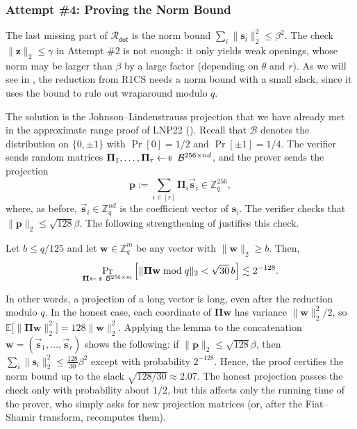 \documentclass[../../book.tex]{subfiles}
\begin{document}
\subsubsection{Attempt \#4: Proving the Norm Bound}

The last missing part of $\mathcal{R}_{\mathsf{dot}}$ is the norm bound $\sum_i \|\mathbf{s}_i\|_2^2 \leq \beta^2$.
The check $\|\mathbf{z}\|_2 \leq \gamma$ in Attempt \#2 is not enough: it only yields weak openings, whose norm may be larger than $\beta$ by a large factor (depending on $\theta$ and $r$).
As we will see in , the reduction from R1CS needs a norm bound with a small slack, since it uses the bound to rule out wraparound modulo $q$.

The solution is the Johnson--Lindenstrauss projection that we have already met in the approximate range proof of LNP22 ().
Recall that $\mathcal{B}$ denotes the distribution on $\{0, \pm 1\}$ with $\Pr[0] = 1/2$ and $\Pr[\pm 1] = 1/4$.
The verifier sends random matrices $\boldsymbol{\Pi}_1, \dots, \boldsymbol{\Pi}_r \leftarrowS \mathcal{B}^{256 \times nd}$, and the prover sends the projection
\begin{equation*}
    \mathbf{p} := \sum_{i \in [r]} \boldsymbol{\Pi}_i\vec{\mathbf{s}}_i \in \mathbb{Z}_q^{256},
\end{equation*}
where, as before, $\vec{\mathbf{s}}_i \in \mathbb{Z}_q^{nd}$ is the coefficient vector of $\mathbf{s}_i$.
The verifier checks that $\|\mathbf{p}\|_2 \leq \sqrt{128}\beta$.
The following strengthening of  justifies this check.

\begin{lemma}\label{lemma:labrador-jl}
    Let $b \leq q/125$ and let $\mathbf{w} \in \mathbb{Z}_q^m$ be any vector with $\|\mathbf{w}\|_2 \geq b$.
    Then,
    \begin{equation*}
        \Pr_{\boldsymbol{\Pi} \leftarrowS \mathcal{B}^{256 \times m}}\Big[\|\boldsymbol{\Pi}\mathbf{w} \bmod q\|_2 < \sqrt{30}\,b\Big] \lesssim 2^{-128}.
    \end{equation*}
\end{lemma}

In other words, a projection of a long vector is long, even after the reduction modulo $q$.
In the honest case, each coordinate of $\boldsymbol{\Pi}\mathbf{w}$ has variance $\|\mathbf{w}\|_2^2/2$, so $\mathbb{E}\big[\|\boldsymbol{\Pi}\mathbf{w}\|_2^2\big] = 128\|\mathbf{w}\|_2^2$.
Applying the lemma to the concatenation $\mathbf{w} = (\vec{\mathbf{s}}_1,\dots,\vec{\mathbf{s}}_r)$ shows the following:
if $\|\mathbf{p}\|_2 \leq \sqrt{128}\beta$, then $\sum_i\|\mathbf{s}_i\|_2^2 \leq \frac{128}{30}\beta^2$ except with probability $2^{-128}$.
Hence, the proof certifies the norm bound up to the slack $\sqrt{128/30} \approx 2.07$.
The honest projection passes the check only with probability about $1/2$, but this affects only the running time of the prover, who simply asks for new projection matrices (or, after the Fiat--Shamir transform, recomputes them).
\end{document}
